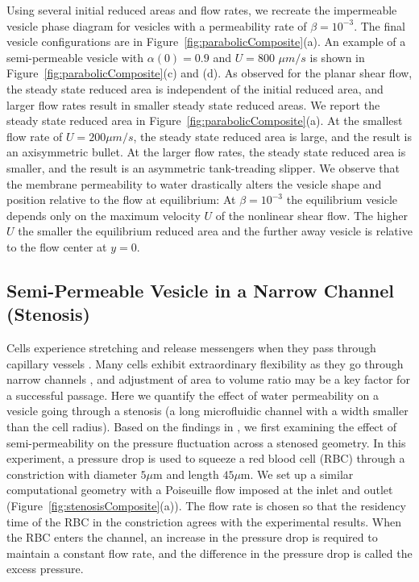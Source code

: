 \documentclass[9pt,twocolumn,twoside,lineno]{pnas-new}
\begin{document}
Using several initial reduced areas and flow rates, we recreate the impermeable vesicle phase
diagram for vesicles with a permeability rate of $\beta = 10^{-3}$. The
final vesicle configurations are in
Figure~\ref{fig:parabolicComposite}(a). An example of a semi-permeable vesicle with $\alpha(0) = 0.9$ and $U=800$ $\mu m/s$ is
shown in Figure~\ref{fig:parabolicComposite}(c) and (d). 
%
As observed for the planar shear flow,
the steady state reduced area is independent of the initial reduced
area, and larger flow rates result in smaller steady state reduced
areas. We report the steady state reduced area in
Figure~\ref{fig:parabolicComposite}(a). At the smallest flow rate of $U= 200 \mu m/s$, the steady state reduced area is large, and the result
is an axisymmetric bullet. At the larger flow rates, the steady state
reduced area is smaller, and the result is an asymmetric tank-treading
slipper. We observe that the membrane permeability to water drastically alters the vesicle shape and position relative to the flow at equilibrium: At $\beta=10^{-3}$ the equilibrium vesicle depends only on the maximum velocity $U$ of the nonlinear shear flow. The higher $U$ the smaller the equilibrium reduced area and the further away vesicle is relative to the flow center at $y=0$. 
 
\subsection*{Semi-Permeable Vesicle in a Narrow Channel (Stenosis)}
Cells experience stretching and release messengers when they pass through capillary vessels \cite{Wan2008_PNAS,ForsythWan2011_PNAS,Pak2015_PNAS}.
Many cells exhibit extraordinary flexibility as they go through narrow channels \cite{AuStoreyMoore2016_PNAS}, and adjustment of area to volume ratio may be a key factor for a successful passage.
Here we quantify the effect of water permeability on a vesicle going through a stenosis (a long microfluidic channel with a width smaller than the cell radius).
Based on the findings in 
\cite{abk-fai-sto2006}, we first examining the effect of
semi-permeability on the pressure fluctuation across a stenosed
geometry. In this experiment, a pressure drop is used to squeeze a
red blood cell (RBC) through a constriction with diameter $5\mu$m and
length $45\mu$m. We set up a similar computational geometry with a
Poiseuille flow imposed at the inlet and outlet
(Figure~\ref{fig:stenosisComposite}(a)). The flow rate is chosen so that
the residency time of the RBC in the constriction agrees with the
experimental results. When the RBC enters the channel, an increase in the pressure drop is required to maintain a constant flow
rate, and the difference in the pressure drop is called the excess
pressure. 
\end{document}
